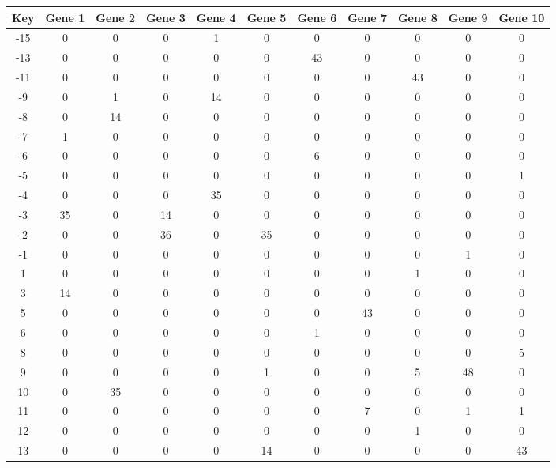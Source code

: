 \begin{tabular}{|c|c|c|c|c|c|c|c|c|c|c|}
\hline
Key & Gene 1 & Gene 2 & Gene 3 & Gene 4 & Gene 5 & Gene 6 & Gene 7 & Gene 8 & Gene 9 & Gene 10 \\
\hline
-15 & 0 & 0 & 0 & 1 & 0 & 0 & 0 & 0 & 0 & 0 \\
-13 & 0 & 0 & 0 & 0 & 0 & 43 & 0 & 0 & 0 & 0 \\
-11 & 0 & 0 & 0 & 0 & 0 & 0 & 0 & 43 & 0 & 0 \\
-9 & 0 & 1 & 0 & 14 & 0 & 0 & 0 & 0 & 0 & 0 \\
-8 & 0 & 14 & 0 & 0 & 0 & 0 & 0 & 0 & 0 & 0 \\
-7 & 1 & 0 & 0 & 0 & 0 & 0 & 0 & 0 & 0 & 0 \\
-6 & 0 & 0 & 0 & 0 & 0 & 6 & 0 & 0 & 0 & 0 \\
-5 & 0 & 0 & 0 & 0 & 0 & 0 & 0 & 0 & 0 & 1 \\
-4 & 0 & 0 & 0 & 35 & 0 & 0 & 0 & 0 & 0 & 0 \\
-3 & 35 & 0 & 14 & 0 & 0 & 0 & 0 & 0 & 0 & 0 \\
-2 & 0 & 0 & 36 & 0 & 35 & 0 & 0 & 0 & 0 & 0 \\
-1 & 0 & 0 & 0 & 0 & 0 & 0 & 0 & 0 & 1 & 0 \\
1 & 0 & 0 & 0 & 0 & 0 & 0 & 0 & 1 & 0 & 0 \\
3 & 14 & 0 & 0 & 0 & 0 & 0 & 0 & 0 & 0 & 0 \\
5 & 0 & 0 & 0 & 0 & 0 & 0 & 43 & 0 & 0 & 0 \\
6 & 0 & 0 & 0 & 0 & 0 & 1 & 0 & 0 & 0 & 0 \\
8 & 0 & 0 & 0 & 0 & 0 & 0 & 0 & 0 & 0 & 5 \\
9 & 0 & 0 & 0 & 0 & 1 & 0 & 0 & 5 & 48 & 0 \\
10 & 0 & 35 & 0 & 0 & 0 & 0 & 0 & 0 & 0 & 0 \\
11 & 0 & 0 & 0 & 0 & 0 & 0 & 7 & 0 & 1 & 1 \\
12 & 0 & 0 & 0 & 0 & 0 & 0 & 0 & 1 & 0 & 0 \\
13 & 0 & 0 & 0 & 0 & 14 & 0 & 0 & 0 & 0 & 43 \\
\hline
\end{tabular}
